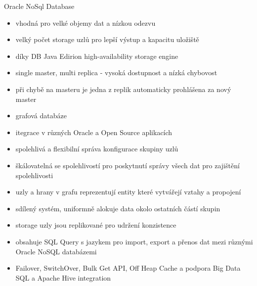 \documentclass{article}
\begin{document}
	\begin{subsubsection}{Oracle NoSql Database}
		\begin{itemize}
			\item vhodná pro velké objemy dat a nízkou odezvu
			\item velký počet storage uzlů pro lepší výstup a kapacitu uložiště
			\item díky DB Java Edirion high-availability storage engine
			\item single master, multi replica - vysoká dostupnost a nízká chybovost
			\item při chybě na masteru je jedna z replik automaticky prohlášena za nový master
			\item grafová databáze
			\item itegrace v různých Oracle a Open Source aplikacích
			\item spolehlivá a flexibilní správa konfigurace skupiny uzlů
			\item škálovatelná se spolehlivostí pro poskytnutí správy všech dat pro zajištění spolehlivosti
			\item uzly a hrany v grafu reprezentují entity které vytvářejí vztahy a propojení
			\item sdílený systém, uniformně alokuje data okolo ostatních částí skupin
			\item storage uzly jsou replikované pro udržení konzistence
			\item obsahuje SQL Query s jazykem pro import, export a přenos dat mezi různými Oracle NoSQL databázemi
			\item Failover, SwitchOver, Bulk Get API, Off Heap Cache a podpora Big Data SQL a Apache Hive integration
			
		\end{itemize}
	\end{subsubsection}
\end{document}
